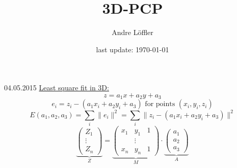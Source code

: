 \documentclass[a4paper,10pt,ngerman]{article}
\title{3D-PCP}
\author{Andre Löffler}
\date{last update: \today}
\begin{document}
\maketitle

\begin{section}{04.05.2015}
\underline{Least square fit in 3D:}\\
\[z= a_1x + a_2y + a_3\]
\[ e_i = z_i - (a_1x_i+a_2y_i+a_3) \text{  for points  } (x_i,y_i,z_i)\]
\[ E(a_1,a_2,a_3) = \sum_i \|e_i\|^2  = \sum_i \|z_i - (a_1x_i + a_2y_i + a_3)\|^2\]
\[ \underbrace{\begin{pmatrix}
    Z_1 \\ \vdots \\ Z_n
   \end{pmatrix}}_{Z} = 
   \underbrace{\begin{pmatrix}
    x_1 & y_1 & 1 \\
    &\vdots& \\
    x_n & y_n & 1 
   \end{pmatrix}}_{M} \cdot
   \underbrace{\begin{pmatrix}
    a_1 \\ a_2 \\ a_3
   \end{pmatrix}}_{A}
 \]
\end{section}
\end{document}
